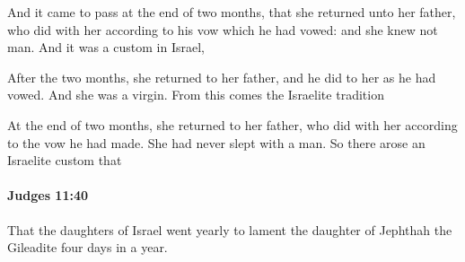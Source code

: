 			\begin{versebox}
					\item[BHS] 
					\item[ASV] And it came to pass at the end of two months, that she returned unto her father, who did with her according to his vow which he had vowed: and she knew not man. And it was a custom in Israel,
					\item[NIV] After the two months, she returned to her father, and he did to her as he had vowed. And she was a virgin. From this comes the Israelite tradition
					\item[NRSV] At the end of two months, she returned to her father, who did with her according to the vow he had made. She had never slept with a man. So there arose an Israelite custom that
			\end{versebox}

		\paragraph{Judges 11:40} %
			\label{JUDGES-11-40}

			That the daughters of Israel went yearly to lament the daughter of Jephthah the Gileadite four days in a year.

